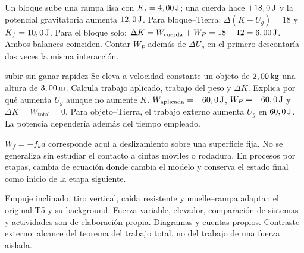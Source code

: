 \documentclass[11pt,a4paper]{article}
\begin{document}
Un bloque sube una rampa lisa con $K_i=4,00\,\mathrm{J}$; una cuerda hace $+18,0\,\mathrm{J}$
y la potencial gravitatoria aumenta $12,0\,\mathrm{J}$.
Para bloque--Tierra: $\Delta(K+U_g)=18$ y $K_f=10,0\,\mathrm{J}$.
Para el bloque solo: $\Delta K=W_{\mathrm{cuerda}}+W_P=18-12=6,00\,\mathrm{J}$.
Ambos balances coinciden. Contar $W_P$ adem\'as de $\Delta U_g$ en el primero
descontar\'ia dos veces la misma interacci\'on.

\begin{exercisebox}{subir sin ganar rapidez}
Se eleva a velocidad constante un objeto de $2,00\,\mathrm{kg}$ una altura de
$3,00\,\mathrm{m}$. Calcula trabajo aplicado, trabajo del peso y $\Delta K$.
Explica por qu\'e aumenta $U_g$ aunque no aumente $K$.
\solutionblock
$W_{\mathrm{aplicada}}=+60,0\,\mathrm{J}$, $W_P=-60,0\,\mathrm{J}$ y
$\Delta K=W_{\mathrm{total}}=0$.
Para objeto--Tierra, el trabajo externo aumenta $U_g$ en $60,0\,\mathrm{J}$.
La potencia depender\'ia adem\'as del tiempo empleado.
\end{exercisebox}

\begin{warnbox}
$W_f=-f_kd$ corresponde aqu\'i a deslizamiento sobre una superficie fija.
No se generaliza sin estudiar el contacto a cintas m\'oviles o rodadura.
En procesos por etapas, cambia de ecuaci\'on donde cambia el modelo y conserva
el estado final como inicio de la etapa siguiente.
\end{warnbox}

Empuje inclinado, tiro vertical, ca\'ida resistente y muelle--rampa adaptan
el original T5 y su background. Fuerza variable, elevador, comparaci\'on de
sistemas y actividades son de elaboraci\'on propia. Diagramas y cuentas propios.
Contraste externo: alcance del teorema del trabajo total, no del trabajo de una fuerza aislada.
\end{document}
